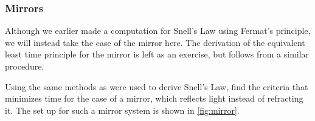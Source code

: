 \subsubsection{Mirrors}
Although we earlier made a computation for Snell's Law using Fermat's principle, we will instead take the case of the mirror here. The derivation of the equivalent least time principle for the mirror is left as an exercise, but follows from a similar procedure.
\begin{exercise}
    Using the same methods as were used to derive Snell's Law, find the criteria that minimizes time for the case of a mirror, which reflects light instead of refracting it. The set up for such a mirror system is shown in \autoref{fig:mirror}.
\begin{figure}[H]
    \centering



\begin{tikzpicture}[x=0.75pt,y=0.75pt,yscale=-1,xscale=1]


\end{tikzpicture}
\end{figure}
\end{exercise}
